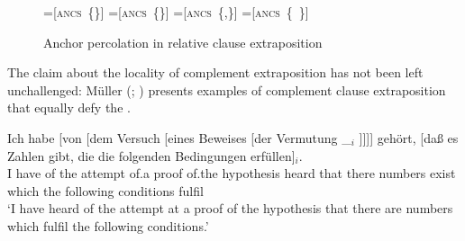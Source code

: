 \documentclass[output=paper
,notxmath 
 	        ,biblatex
                ,babelshorthands
                ,newtxmath
                ,draftmode
                ,colorlinks, citecolor=brown
]{langscibook}
\begin{document}
\begin{figure}
  
  { \newbox\onebox \newbox\twobox \newbox\onetwobox \newbox\emptybox

    \setbox\onebox=\hbox{[\textsc{ancs} \{\}]}
    \setbox\twobox=\hbox{[\textsc{ancs} \{\}]}
    \setbox\onetwobox=\hbox{[\textsc{ancs} \{,\}]}
    \setbox\emptybox=\hbox{[\textsc{ancs} \{ \}]}
}
\caption{Anchor percolation in relative clause extraposition \citep{Kiss2005a}}
\end{figure}

The claim about the locality of complement extraposition has not been
left unchallenged: Müller (\citeyear[]{Mueller99a};
\citeyear[]{Mueller2004d}) presents examples of complement
clause extraposition that equally defy the .

\ea
\label{ex-versuch-eines-beweises-der-vermutung} 
{\gll Ich habe [von [dem Versuch [eines Beweises [der Vermutung \_$_i$ ]]]] gehört, [daß es Zahlen gibt, die die folgenden Bedingungen erfüllen]$_i$.\footnotemark\\
      I have \spacebr{}of \spacebr{}the attempt \spacebr{}of.a proof \spacebr{}of.the hypothesis {} {}
      heard \spacebr{}that there numbers exist which the following conditions
      fulfil\\
      \glt `I have heard of the attempt at a proof of the hypothesis
      that there are numbers which fulfil the following conditions.'
    }  
    
\end{document}
